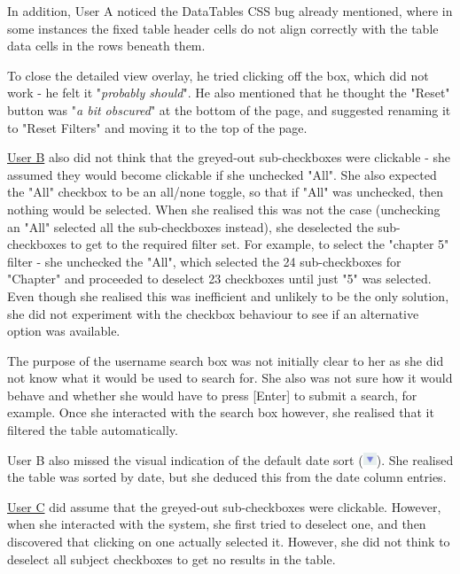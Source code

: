 In addition, User A noticed the DataTables CSS bug already mentioned, where in some instances the fixed table header cells do not align correctly with the table data cells in the rows beneath them.

To close the detailed view overlay, he tried clicking off the box, which did not work - he felt it "\textit{probably should}". He also mentioned that he thought the "Reset" button was "\textit{a bit obscured}" at the bottom of the page, and suggested renaming it to "Reset Filters" and moving it to the top of the page. 

\underline{User B} also did not think that the greyed-out sub-checkboxes were clickable - she assumed they would become clickable if she unchecked "All". She also expected the "All" checkbox to be an all/none toggle, so that if "All" was unchecked, then nothing would be selected. When she realised this was not the case (unchecking an "All" selected all the sub-checkboxes instead), she deselected the sub-checkboxes to get to the required filter set. For example, to select the "chapter 5" filter - she unchecked the "All", which selected the 24 sub-checkboxes for "Chapter" and proceeded to deselect 23 checkboxes until just "5" was selected. Even though she realised this was inefficient and unlikely to be the only solution, she did not experiment with the checkbox behaviour to see if an alternative option was available. 

The purpose of the username search box was not initially clear to her as she did not know what it would be used to search for. She also was not sure how it would behave and whether she would have to press [Enter] to submit a search, for example. Once she interacted with the search box however, she realised that it filtered the table automatically. 

User B also missed the visual indication of the default date sort (\includegraphics[width=0.4cm]{Figures/sortarrowdown.png}). She realised the table was sorted by date, but she deduced this from the date column entries.

\underline{User C} did assume that the greyed-out sub-checkboxes were clickable. However, when she interacted with the system, she first tried to deselect one, and then discovered that clicking on one actually selected it. However, she did not think to deselect all subject checkboxes to get no results in the table. 


